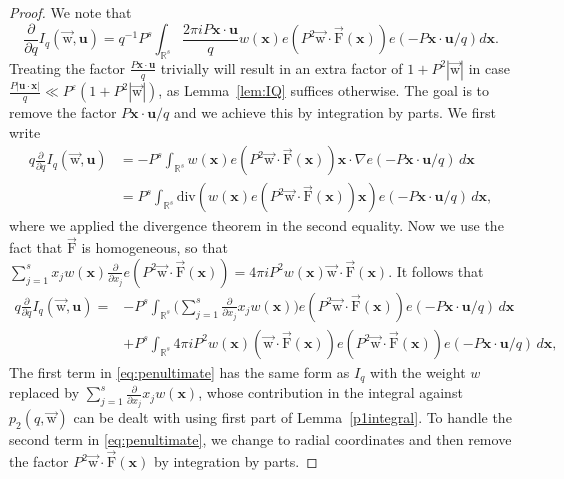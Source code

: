 \documentclass[letterpaper,11pt]{amsart}
\numberwithin{equation}{section}
\theoremstyle{definition}
\numberwithin{equation}{section}
\newcommand{\x}{\mathbf{x}}
\newcommand{\uu}{\mathbf{u}}
\newcommand{\uw}{{\vec{\mathrm{w}}}}
\newcommand{\uF}{{\vec{\mathrm{F}} }}
\newcommand{\ve}{\varepsilon}
\newcommand{\R}{\mathbb{R}}
\newcommand{\nF}{\uF}
\begin{document}
\begin{proof}
	We note that
	\begin{equation*}
		\frac{\partial}{\partial q}I_q(\uw,\uu)=q^{-1}P^s\int_{\R^s}\frac{2\pi i P\x\cdot\uu}{q}w\left(\x\right)e(P^2\uw\cdot \nF(\x))e(-P\x\cdot\uu/q)d\x.
	\end{equation*}
	Treating the factor $\frac{P\x\cdot\uu}{q}$ trivially will result in an extra factor of $1+P^2 |\uw|$ in case $
		\frac{P|\uu\cdot\x|}{q}\ll P^\ve(1+P^2|\uw|)$, as Lemma~\ref{lem:IQ} suffices otherwise. 
	The goal is to remove the factor $P\x \cdot \uu/q$ and we achieve this by integration by parts. 
 We first write 
	\begin{align*}
		q \frac{\partial}{\partial q}I_q(\uw, \uu)
		\nonumber
		&=-P^s  \int_{\R^s}
		w\left(\x\right)e(P^2\uw\cdot \nF(\x)) \x \cdot \nabla e(-P\x\cdot\uu/q)
		 \,
		d\x\,\\
		\nonumber
		&=
		P^s  \int_{\R^s}
		\text{div}\left(
		w\left(\x\right)e(P^2\uw\cdot \nF(\x))\x
		\right)
		e(-P\x\cdot\uu/q)\,
		d\x,
	\end{align*}
	where we applied the divergence theorem in the second equality. Now we use the fact that $\nF$ is homogeneous, so that $\sum_{j=1}^s x_j w(\x)\frac{\partial}{\partial x_j}  e(P^2 \uw\cdot \nF(\x))= 4\pi i P^2 w(\x) \uw \cdot \nF(\x).$ It follows that
\begin{align}\nonumber
q \frac{\partial}{\partial q}I_q(\uw, \uu)={}&
-P^s  \int_{\R^s}
		\bigg(\sum_{j=1}^s \frac{\partial}{\partial x_j} x_j w(\x)\bigg)
		e(P^2\uw\cdot \nF(\x))
		e(-P\x\cdot\uu/q)\,
		d\x 
		\\    \label{eq:penultimate}		
		&
		+P^s  \int_{\R^s} 4\pi i P^2
		w(\x)  (\uw \cdot \nF(\x)) e(P^2\uw \cdot \nF(\x)) e(-P\x\cdot\uu/q)\,
		d\x,
\end{align}
	The first term in \eqref{eq:penultimate} has the same form as \(I_q\) with the weight \(w\) replaced by $\sum_{j=1}^s \frac{\partial}{\partial x_j} x_j w(\x)$, whose contribution in the integral against $p_2(q, \uw)$ can be dealt with using first part of Lemma~\ref{p1integral}.
	To handle the second term in \eqref{eq:penultimate}, we change to radial coordinates and then remove the factor $P^2 \uw \cdot \nF(\x)$ by integration by parts. 
	

\end{proof}
\end{document}
